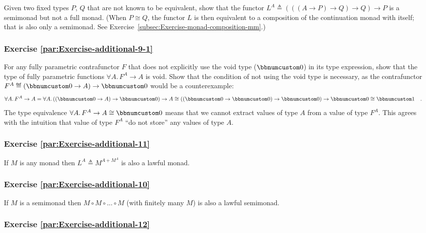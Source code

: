 Given two fixed types $P$, $Q$ that are not known to be equivalent,
show that the functor $L^{A}\triangleq\left(\left(\left(A\rightarrow P\right)\rightarrow Q\right)\rightarrow Q\right)\rightarrow P$
is a semimonad but not a full monad. (When $P\cong Q$, the functor
$L$ is then equivalent to a composition of the continuation monad
with itself; that is also only a semimonad. See Exercise~\ref{subsec:Exercise-monad-composition-mm}.)

\subsubsection{Exercise \label{par:Exercise-additional-9-1}\ref{par:Exercise-additional-9-1}}

For any fully parametric contrafunctor $F$ that does not explicitly
use the void type ($\bbnum 0$) in its type expression,
show that the type of fully parametric functions $\forall A.\,F^{A}\rightarrow A$
is void. Show that the condition of not using the void type is necessary,
as the contrafunctor $F^{A}\triangleq(\bbnum 0\rightarrow A)\rightarrow\bbnum 0$
would be a counterexample:
\[
\forall A.\,F^{A}\rightarrow A=\forall A.\,((\bbnum 0\rightarrow A)\rightarrow\bbnum 0)\rightarrow A\cong((\bbnum 0\rightarrow\bbnum 0)\rightarrow\bbnum 0)\rightarrow\bbnum 0\cong\bbnum 1\quad.
\]
The type equivalence $\forall A.\,F^{A}\rightarrow A\cong\bbnum 0$
means that we cannot extract values of type $A$ from a value of type
$F^{A}$. This agrees with the intuition that value of type $F^{A}$
\textsf{``}do not store\textsf{''} any values of type $A$.

\subsubsection{Exercise \label{par:Exercise-additional-11}\ref{par:Exercise-additional-11}}

If $M$ is any monad then $L^{A}\triangleq M^{A+M^{A}}$ is also a
lawful monad.

\subsubsection{Exercise \label{par:Exercise-additional-10}\ref{par:Exercise-additional-10}}

If $M$ is a semimonad then $M\circ M\circ...\circ M$ (with finitely
many $M$) is also a lawful semimonad.

\subsubsection{Exercise \label{par:Exercise-additional-12}\ref{par:Exercise-additional-12}}

